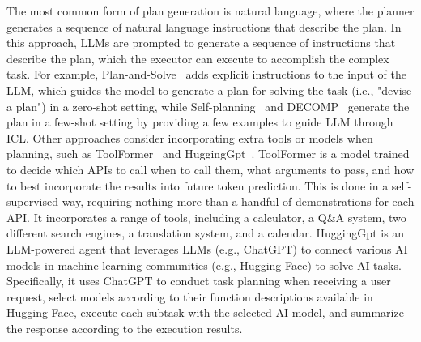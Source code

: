 The most common form of plan generation is natural language, where the planner generates a sequence of natural language instructions that describe the plan.
In this approach, LLMs are prompted to generate a sequence of instructions that describe the plan, which the executor can execute to accomplish the complex task.
For example, Plan-and-Solve~\cite{wang2023plan} adds explicit instructions to the input of the LLM, which guides the model to generate a plan for solving the task (i.e., "devise a plan") in a zero-shot setting, while Self-planning~\cite{jiang2024selfplanning} and DECOMP~\cite{khot2022decomposed} generate the plan in a few-shot setting by providing a few examples to guide LLM through ICL\@.
Other approaches consider incorporating extra tools or models when planning, such as ToolFormer~\cite{schick2023toolformer} and HuggingGpt~\cite{shen2023hugginggpt}.
ToolFormer is a model trained to decide which APIs to call when to call them, what arguments to pass, and how to best incorporate the results into future token prediction.
This is done in a self-supervised way, requiring nothing more than a handful of demonstrations for each API. It incorporates a range of tools, including a calculator, a Q\&A system, two different search engines, a translation system, and a calendar.
HuggingGpt is an LLM-powered agent that leverages LLMs (e.g., ChatGPT) to connect various AI models in machine learning communities (e.g., Hugging Face) to solve AI tasks.
Specifically, it uses ChatGPT to conduct task planning when receiving a user request, select models according to their function descriptions available in Hugging Face, execute each subtask with the selected AI model, and summarize the response according to the execution results.

